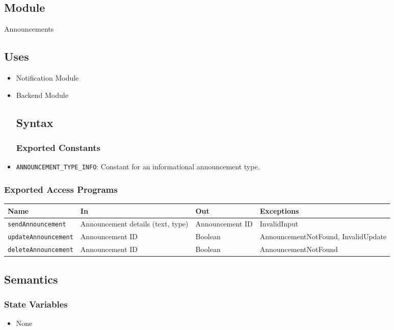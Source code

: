 \documentclass[12pt, titlepage]{article}
\begin{document}
\subsection{Module}
Announcements

\subsection{Uses}
\begin{itemize}
    \item Notification Module
    \item Backend Module
 
\subsection{Syntax}

\subsubsection{Exported Constants}
  \item \texttt{ANNOUNCEMENT\_TYPE\_INFO}: Constant for an informational announcement type.
\end{itemize}

\subsubsection{Exported Access Programs}
\begin{center}
\begin{tabular}{|p{3.2cm}|p{4cm}|p{3.5cm}|p{4cm}|}
\hline
\textbf{Name} & \textbf{In} & \textbf{Out} & \textbf{Exceptions} \\
\hline
\texttt{sendAnnouncement} & Announcement details (text, type) & Announcement ID & InvalidInput \\
\texttt{updateAnnouncement} & Announcement ID & Boolean & AnnouncementNotFound, InvalidUpdate \\
\texttt{deleteAnnouncement} & Announcement ID & Boolean & AnnouncementNotFound \\
\hline
\end{tabular}
\end{center}

\subsection{Semantics}

\subsubsection{State Variables}
\begin{itemize}
    \item None
\end{itemize}
\end{document}
